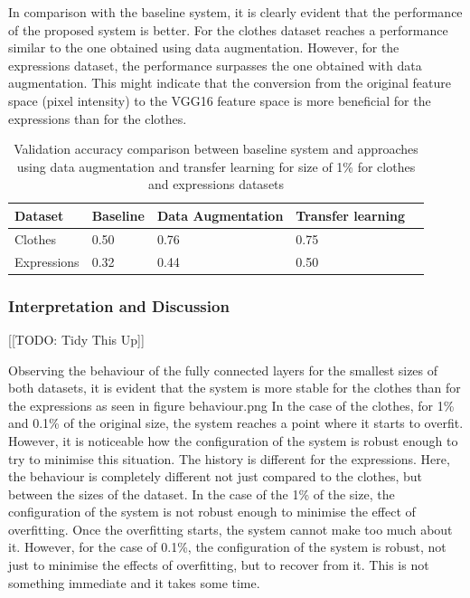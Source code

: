 \documentclass{article}
\begin{document}
In comparison with the baseline system, it is clearly evident that the performance of the proposed system is better. For the clothes dataset reaches a performance similar to the one obtained using data augmentation. However, for the expressions dataset, the performance surpasses the one obtained with data augmentation. This might indicate that the conversion from the original feature space (pixel intensity) to the VGG16 feature space is more beneficial for the expressions than for the clothes.

\begin{table}[!htb]
  \centering
  \begin{tabular}{| l | l | l | l | l |}
    \hline
    \textbf{Dataset} & \textbf{Baseline} & \textbf{Data Augmentation}& \textbf{Transfer learning} \\ \hline
    Clothes & 0.50 & 0.76 & 0.75 \\ \hline
    Expressions & 0.32  & 0.44 & 0.50 \\ \hline
  \end{tabular}
  \caption{Validation accuracy comparison between baseline system and approaches using data augmentation and transfer learning for size of 1\% for clothes and expressions datasets}
  \label{tab:2}
\end{table}

\subsubsection{\textbf{Interpretation and Discussion}}

[[TODO: Tidy This Up]]

Observing the behaviour of the fully connected layers for the smallest sizes of both datasets, it is evident that the system is more stable for the clothes than for the expressions as seen in figure behaviour.png In the case of the clothes, for 1\% and 0.1\% of the original size, the system reaches a point where it starts to overfit. However, it is noticeable how the configuration of the system is robust enough to try to minimise this situation. The history is different for the expressions. Here, the behaviour is completely different not just compared to the clothes, but between the sizes of the dataset. In the case of the 1\% of the size, the configuration of the system is not robust enough to minimise the effect of overfitting. Once the overfitting starts, the system cannot make too much about it. However, for the case of 0.1\%, the configuration of the system is robust, not just to minimise the effects of overfitting, but to recover from it. This is not something immediate and it takes some time.
\end{document}
